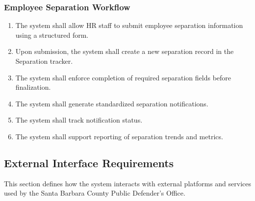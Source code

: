 \documentclass[12pt]{article}
\begin{document}
\subsubsection{Employee Separation Workflow}

\begin{enumerate}
    \item The system shall allow HR staff to submit employee separation information using a structured form.
    
    \item Upon submission, the system shall create a new separation record in the Separation tracker.
    
    \item The system shall enforce completion of required separation fields before finalization.
    
    \item The system shall generate standardized separation notifications.
    
    \item The system shall track notification status.
    
    \item The system shall support reporting of separation trends and metrics.
\end{enumerate}

\subsection{External Interface Requirements}

This section defines how the system interacts with external platforms and services used by the Santa Barbara County Public Defender’s Office.
\end{document}
